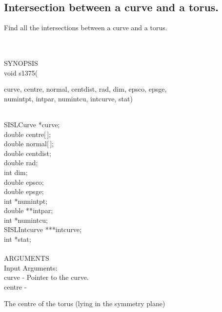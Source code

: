 \subsection{Intersection between a curve and a torus.}
\begin{minipg1}
  Find all the intersections between a curve and a torus.
\end{minipg1} \\ \\
SYNOPSIS\\
        \>void s1375(\begin{minipg3}
        {\fov curve}, {\fov centre}, {\fov normal}, {\fov centdist}, {\fov rad}, {\fov dim}, {\fov epsco}, {\fov epsge},\\ {\fov numintpt}, {\fov intpar},
                        {\fov numintcu}, {\fov intcurve}, {\fov stat})
                \end{minipg3}\\[0.3ex]
                \>\>    SISLCurve       \>      *{\fov curve};\\
                \>\>    double  \>      {\fov centre[\,]};\\
                \>\>    double  \>      {\fov normal}[\,];\\
                \>\>    double  \>      {\fov centdist};\\
                \>\>    double  \>      {\fov rad};\\
                \>\>    int             \>      {\fov dim};\\
                \>\>    double  \>      {\fov epsco};\\
                \>\>    double  \>      {\fov epsge};\\
                \>\>    int     \>      *{\fov numintpt};\\
                \>\>    double  \>      **{\fov intpar};\\
                \>\>    int     \>      *{\fov numintcu};\\
                \>\>    SISLIntcurve \> ***{\fov intcurve};\\
                \>\>    int     \>      *{\fov stat};\\
\\
ARGUMENTS\\
        \>Input Arguments:\\
        \>\>    {\fov curve}    \> - \> Pointer to the curve.\\
        \>\>    {\fov centre}   \> - \> \begin{minipg2}
                                The centre of the torus (lying in the symmetry plane)
                                \end{minipg2}\\[0.3ex]
